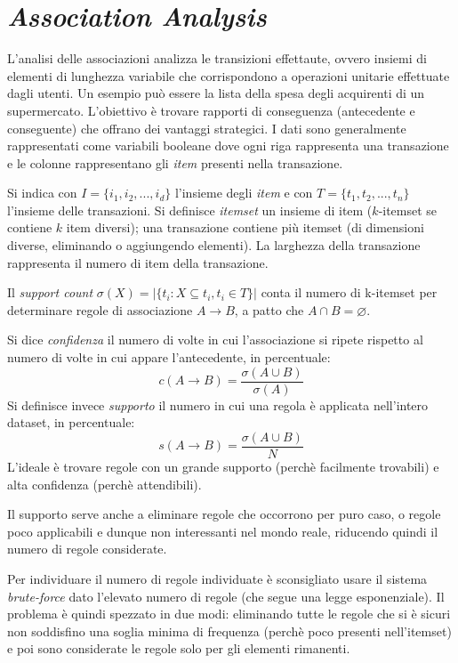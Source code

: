 \documentclass[11pt, a4page, twocolumn]{article}
\begin{document}
\newpage
\part{\textit{Association Analysis}}
L'analisi delle associazioni analizza le transizioni effettaute, ovvero insiemi di elementi di lunghezza variabile che corrispondono a operazioni unitarie effettuate dagli utenti.
Un esempio può essere la lista della spesa degli acquirenti di un supermercato.
L'obiettivo è trovare rapporti di conseguenza (antecedente e conseguente) che offrano dei vantaggi strategici.
I dati sono generalmente rappresentati come variabili booleane dove ogni riga rappresenta una transazione e le colonne rappresentano gli \textit{item} presenti nella transazione.

Si indica con $I = \{i_1, i_2, ..., i_d\}$ l'insieme degli \textit{item} e con $T = \{t_1, t_2, ..., t_n\}$ l'insieme delle transazioni.
Si definisce \textit{itemset} un insieme di item ($k$-itemset se contiene $k$ item diversi); una transazione contiene più itemset (di dimensioni diverse, eliminando o aggiungendo elementi).
La larghezza della transazione rappresenta il numero di item della transazione.

Il \textit{support count} $\sigma(X) = |\{t_i : X \subseteq t_i, t_i \in T\}|$ conta il numero di k-itemset per determinare regole di associazione $A \rightarrow B$, a patto che $A \cap B = \varnothing$.

Si dice \textit{confidenza} il numero di volte in cui l'associazione si ripete rispetto al numero di volte in cui appare l'antecedente, in percentuale:
\begin{equation*}
c(A \rightarrow B) = \frac{\sigma(A \cup B)}{\sigma(A)}
\end{equation*}
Si definisce invece \textit{supporto} il numero in cui una regola è applicata nell'intero dataset, in percentuale:
\begin{equation*}
s(A \rightarrow B) = \frac{\sigma(A \cup B)}{N}
\end{equation*}
L'ideale è trovare regole con un grande supporto (perchè facilmente trovabili) e alta confidenza (perchè attendibili).

Il supporto serve anche a eliminare regole che occorrono per puro caso, o regole poco applicabili e dunque non interessanti nel mondo reale, riducendo quindi il numero di regole considerate. \newline

Per individuare il numero di regole individuate è sconsigliato usare il sistema \textit{brute-force} dato l'elevato numero di regole (che segue una legge esponenziale).
Il problema è quindi spezzato in due modi: eliminando tutte le regole che si è sicuri non soddisfino una soglia minima di frequenza (perchè poco presenti nell'itemset) e poi sono considerate le regole solo per gli elementi rimanenti.
\end{document}
